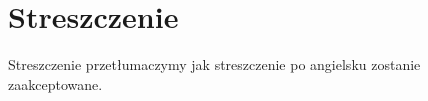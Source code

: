 \chapter*{Streszczenie}

Streszczenie przetłumaczymy jak streszczenie po angielsku zostanie zaakceptowane.
